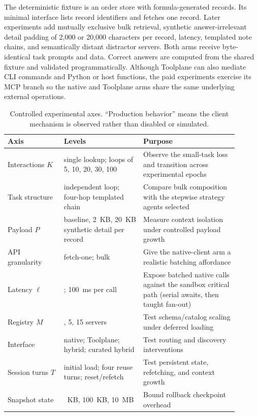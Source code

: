 \documentclass[10pt,twocolumn]{article}
\begin{document}
The deterministic fixture is an order store with formula-generated records.
Its minimal interface lists record identifiers and fetches one record.  Later
experiments add mutually exclusive bulk retrieval, synthetic answer-irrelevant
detail padding of 2,000 or 20,000 characters per record, latency, templated
note chains, and semantically distant distractor servers.  Both arms
receive byte-identical task prompts and data.  Correct answers are computed
from the shared fixture and validated programmatically.  Although Toolplane can
also mediate CLI commands and Python or host functions, the paid experiments
exercise its MCP branch so the native and Toolplane arms share the same
underlying external operations.

\begin{table}[t]
\centering
\small
\caption{Controlled experimental axes.  ``Production behavior'' means the
client mechanism is observed rather than disabled or simulated.}
\label{tab:axes}
\begin{tabular}{>{\raggedright\arraybackslash}p{0.22\linewidth}>{\raggedright\arraybackslash}p{0.31\linewidth}>{\raggedright\arraybackslash}p{0.37\linewidth}}
\toprule
Axis & Levels & Purpose \\
\midrule
Interactions $K$ & single lookup; loops of 5, 10, 20, 30, 100 & Observe the
small-task loss and transition across experimental epochs \\
Task structure & independent loop; four-hop templated chain & Compare bulk
composition with the stepwise strategy agents selected \\
Payload $P$ & baseline, 2~KB, 20~KB synthetic detail per record & Measure
context isolation under controlled payload growth \\
API granularity & fetch-one; bulk & Give the native-client arm a realistic batching
affordance \\
Latency $\ell$ & 0; 100~ms per call & Expose batched native calls against the
sandbox critical path (serial awaits, then taught fan-out) \\
Registry $M$ & 1, 5, 15 servers & Test schema/catalog scaling under deferred
loading \\
Interface & native; Toolplane; hybrid; curated hybrid & Test routing and discovery
interventions \\
Session turns $T$ & initial load; four reuse turns; reset/refetch & Test
persistent state, refetching, and context growth \\
Snapshot state & 1~KB, 100~KB, 10~MB & Bound rollback checkpoint overhead \\
\bottomrule
\end{tabular}
\end{table}
\end{document}

